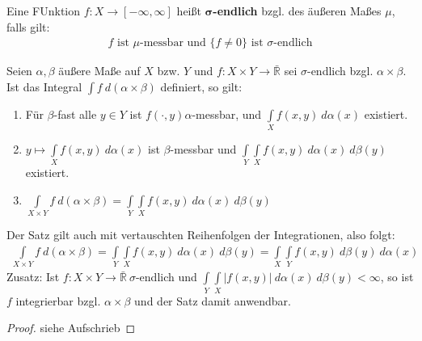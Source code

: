   \begin{definition}
    Eine FUnktion $f: X \to [-\infty, \infty]$ heißt $\bm{\sigma}$\textbf{-endlich} bzgl. des äußeren Maßes $\mu$, falls gilt:
    \begin{align*}
      f \text{ ist } \mu \text{-messbar und } \{f \neq 0\} \text{ ist } \sigma \text{-endlich}
    \end{align*}
  \end{definition}

  \begin{theorem}[Fubini]
    Seien $\alpha, \beta$ äußere Maße auf $X$ bzw. $Y$ und $f: X \times Y \to \bar{\mathbb{R}}$ sei $\sigma$-endlich bzgl. $\alpha \times \beta$. Ist das Integral $\int f \ d(\alpha \times \beta)$ definiert, so gilt:
    \begin{enumerate}
      \item Für $\beta$-fast alle $y \in Y$ ist $f(\cdot, y) \alpha$-messbar, und $\int\limits_X f(x,y) \ d \alpha(x)$ existiert.
      \item $y \mapsto \int\limits_X f(x,y) \ d\alpha(x)$ ist $\beta$-messbar und $\int\limits_Y \int\limits_X f(x,y) \ d\alpha(x) \ d\beta(y)$ existiert.
      \item $\int\limits_{X\times Y} f \ d(\alpha \times \beta) = \int\limits_Y \int\limits_X f(x,y) \ d\alpha(x) \ d\beta(y)$
    \end{enumerate}
    Der Satz gilt auch mit vertauschten Reihenfolgen der Integrationen, also folgt:
    \begin{align*}
      \int\limits_{X\times Y} f \ d(\alpha \times \beta) = \int\limits_Y \int\limits_X f(x,y) \ d\alpha(x) \ d\beta(y) = \int\limits_X \int\limits_Y f(x,y) \ d\beta(y) \ d\alpha(x)
    \end{align*}
    Zusatz: Ist $f: X \times Y \to \bar{\mathbb{R}} \ \sigma$-endlich und $\int\limits_Y \int\limits_X |f(x,y)| \ d\alpha(x) \ d\beta(y) < \infty$, so ist $f$ integrierbar bzgl. $\alpha \times \beta$ und der Satz damit anwendbar.
  \end{theorem}

  \begin{proof}
    siehe Aufschrieb
  \end{proof}

